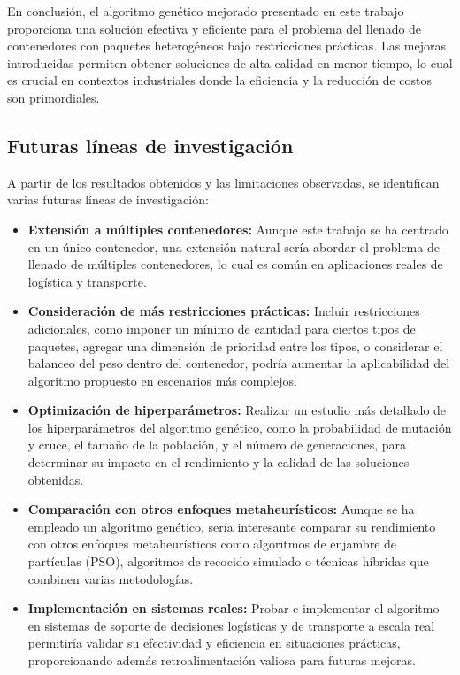 \documentclass[openany]{article}
\begin{document}
En conclusión, el algoritmo genético mejorado presentado en este trabajo proporciona una solución efectiva y eficiente para el problema del llenado de contenedores con paquetes heterogéneos bajo restricciones prácticas. Las mejoras introducidas permiten obtener soluciones de alta calidad en menor tiempo, lo cual es crucial en contextos industriales donde la eficiencia y la reducción de costos son primordiales.

\subsection{Futuras líneas de investigación}

A partir de los resultados obtenidos y las limitaciones observadas, se identifican varias futuras líneas de investigación:

\begin{itemize}
    \item \textbf{Extensión a múltiples contenedores:} Aunque este trabajo se ha centrado en un único contenedor, una extensión natural sería abordar el problema de llenado de múltiples contenedores, lo cual es común en aplicaciones reales de logística y transporte.

    \item \textbf{Consideración de más restricciones prácticas:} Incluir restricciones adicionales, como imponer un mínimo de cantidad para ciertos tipos de paquetes, agregar una dimensión de prioridad entre los tipos, o considerar el balanceo del peso dentro del contenedor, podría aumentar la aplicabilidad del algoritmo propuesto en escenarios más complejos.

    \item \textbf{Optimización de hiperparámetros:} Realizar un estudio más detallado de los hiperparámetros del algoritmo genético, como la probabilidad de mutación y cruce, el tamaño de la población, y el número de generaciones, para determinar su impacto en el rendimiento y la calidad de las soluciones obtenidas.

    \item \textbf{Comparación con otros enfoques metaheurísticos:} Aunque se ha empleado un algoritmo genético, sería interesante comparar su rendimiento con otros enfoques metaheurísticos como algoritmos de enjambre de partículas (PSO), algoritmos de recocido simulado o técnicas híbridas que combinen varias metodologías.

    \item \textbf{Implementación en sistemas reales:} Probar e implementar el algoritmo en sistemas de soporte de decisiones logísticas y de transporte a escala real permitiría validar su efectividad y eficiencia en situaciones prácticas, proporcionando además retroalimentación valiosa para futuras mejoras.


\end{itemize}
\end{document}
